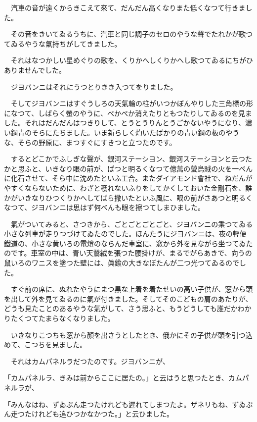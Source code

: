 \documentclass[tate,paper=b6j,jafontsize=9pt]{jlreq}
\begin{document}
　汽車の音が遠くからきこえて來て、だんだん高くなりまた低くなつて行きました。

　その音をきいてゐるうちに、汽車と同じ調子のセロのやうな聲でたれかが歌つてゐるやうな氣持ちがしてきました。

　それはなつかしい星めぐりの歌を、くりかへしくりかへし歌つてゐるにちがひありませんでした。

　ジヨバンニはそれにうつとりきき入つてをりました。



　そしてジヨバンニはすぐうしろの天氣輪の柱がいつかぼんやりした三角標の形になつて、しばらく螢のやうに、ぺかぺか消えたりともつたりしてゐるのを見ました。それはだんだんはつきりして、とうとうりんとうごかないやうになり、濃い鋼青のそらにたちました。いま新らしく灼いたばかりの青い鋼の板のやうな、そらの野原に、まつすぐにすきつと立つたのです。

　するとどこかでふしぎな聲が、銀河ステーシヨン、銀河ステーシヨンと云つたかと思ふと、いきなり眼の前が、ぱつと明るくなつて億萬の螢烏賊の火を一ぺんに化石させて、そら中に沈めたといふ工合。またダイアモンド會社で、ねだんがやすくならないために、わざと穫れないふりをしてかくしておいた金剛石を、誰かがいきなりひつくりかへしてばら撒いたといふ風に、眼の前がさあつと明るくなつて、ジヨバンニは思はず何べんも眼を擦つてしまひました。

　氣がついてみると、さつきから、ごとごとごとごと、ジヨバンニの乘つてゐる小さな列車が走りつづけてゐたのでした。ほんたうにジヨバンニは、夜の輕便鐵道の、小さな黄いろの電燈のならんだ車室に、窓から外を見ながら坐つてゐたのです。車室の中は、青い天鵞絨を張つた腰掛けが、まるでがらあきで、向うの鼠いろのワニスを塗つた壁には、眞鍮の大きなぼたんが二つ光つてゐるのでした。

　すぐ前の席に、ぬれたやうにまつ黒な上着を着たせいの高い子供が、窓から頭を出して外を見てゐるのに氣が付きました。そしてそのこどもの肩のあたりが、どうも見たことのあるやうな氣がして、さう思ふと、もうどうしても誰だかわかりたくつてたまらなくなりました。

　いきなりこつちも窓から顏を出さうとしたとき、俄かにその子供が頭を引つ込めて、こつちを見ました。

　それはカムパネルラだつたのです。ジヨバンニが、

「カムパネルラ、きみは前からここに居たの。」と云はうと思つたとき、カムパネルラが、

「みんなはね、ずゐぶん走つたけれども遲れてしまつたよ。ザネリもね、ずゐぶん走つたけれども追ひつかなかつた。」と云ひました。
\end{document}
